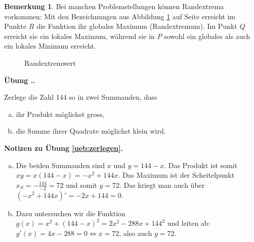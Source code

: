 \documentclass[%
11pt,%
twoside,%
titlepage,%
german,%
headsepline%
]{scrartcl}
\newcommand{\faEyeLightGray}{\textcolor{lightgray}{\faEye}} %
\newcommand{\definition}[1]{\colorbox{emerald}{#1}}
\theoremstyle{definition}
\newtheorem{bem}{Bemerkung}[subsection] %
\theoremstyle{plain}
\newcommand{\concatueb}[1]{ueb:#1}%
\newcommand{\concatlsg}[1]{lsg:#1}%
\newcounter{uebcounter}[section]
\renewcommand{\theuebcounter}{\thesection.\arabic{uebcounter}}  %
\newenvironment{lsg}[1]{%
    \par\noindent\textbf{Notizen zu Übung \ref{\concatueb{#1}}.}%
    \label{\concatlsg{#1}}
}{%
    \par%
}
\newenvironment{uebenv}[1]{%
    \refstepcounter{uebcounter}
    \par\noindent\textbf{Übung \theuebcounter.}%
    \label{\concatueb{#1}}\hfill\hyperref[\concatlsg{#1}]{\faEyeLightGray}\par
}{%
    \par
}
\begin{document}
\begin{bem}
Bei manchen Problemstellungen können \definition{Randextrema} vorkommen: Mit den Bezeichnungen aus Abbildung \ref{randextrem} auf Seite \pageref{randextrem} erreicht im Punkte $R$ die Funktion ihr globales Maximum (Randextremum). Im Punkt $Q$ erreicht sie ein lokales Maximum, während sie in $P$ sowohl ein globales als auch ein lokales Minimum erreicht.

\begin{figure}
\begin{center}
\end{center}
\caption{Randextremwert}\label{randextrem}
\end{figure}
\end{bem}

\begin{uebenv}{zerlegen}
Zerlege die Zahl 144 so in zwei Summanden, dass
\begin{enumerate}[a)]
\item ihr Produkt möglichst gross,
\item die Summe ihrer Quadrate möglichst klein wird.
\end{enumerate}
\end{uebenv}

\begin{lsg}{zerlegen}
    \begin{enumerate}[a)]
        \item Die beiden Summanden sind $x$ und $y=144-x$. Das Produkt ist somit $xy=x(144-x)=-x^2+144x$. Das Maximum ist der Scheitelpunkt $x_S=-\frac{144}{-2}=72$ und somit $y=72$. Das kriegt man auch über $(-x^2+144x)'=-2x+144=0$.
        \item Dazu untersuchen wir die Funktion $g(x)=x^2+(144-x)^2=2x^2-288x+144^2$ und leiten ab: $g'(x)=4x-288=0\Leftrightarrow x=72$, also auch $y=72$.
    \end{enumerate}
\end{lsg}
\end{document}
